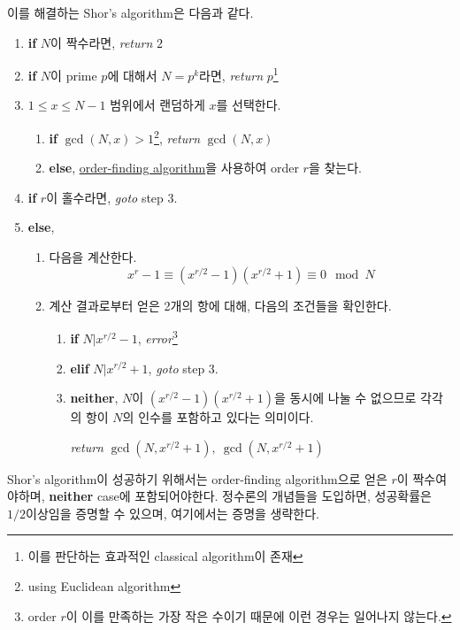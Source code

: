 이를 해결하는 Shor's algorithm은 다음과 같다.
\begin{enumerate}
  \item \textbf{if} $N$이 짝수라면, \textit{return} $2$
  \item \textbf{if} $N$이 prime $p$에 대해서 $N = p^k$라면, \textit{return} $p$\footnote{이를 판단하는 효과적인 classical algorithm이 존재}
  \item $1\le x \le N-1$ 범위에서 랜덤하게 $x$를 선택한다.
  \begin{enumerate}
    \item \textbf{if} $\gcd(N, x) > 1$\footnote{using Euclidean algorithm}, \textit{return}  $\gcd(N, x)$
    \item \textbf{else}, \hyperref[sec:order-finding]{order-finding algorithm}을 사용하여 order $r$을 찾는다.
  \end{enumerate}
  \item \textbf{if} $r$이 홀수라면, \textit{goto} step 3.
  \item \textbf{else},
  \begin{enumerate}
    \item 다음을 계산한다.
    \begin{equation*}
      x^r - 1 \equiv (x^{r/2} - 1)(x^{r/2} + 1) \equiv 0 \mod N
    \end{equation*}
    \item 계산 결과로부터 얻은 2개의 항에 대해, 다음의 조건들을 확인한다.
      \begin{enumerate}
        \item \textbf{if} $N|x^{r/2}-1$, \textit{error}\footnote{order $r$이 이를 만족하는 가장 작은 수이기 때문에 이런 경우는 일어나지 않는다.}
        \item \textbf{elif} $N|x^{r/2}+1$, \textit{goto} step 3.
        \item \textbf{neither}, $N$이 $(x^{r/2}-1)(x^{r/2}+1)$을 동시에 나눌 수 없으므로 각각의 항이 $N$의 인수를 포함하고 있다는 의미이다.
        
        \textit{return} $\boxed{\gcd(N, x^{r/2}+1),\ \gcd(N, x^{r/2}+1)}$
      \end{enumerate}
  \end{enumerate}
\end{enumerate}

\vspace{0.1em}

Shor's algorithm이 성공하기 위해서는 order-finding algorithm으로 얻은 $r$이 짝수여야하며, \textbf{neither} case에 포함되어야한다. 정수론의 개념들을 도입하면, 성공확률은 $1/2$이상임을 증명할 수 있으며, 여기에서는 증명을 생략한다.


